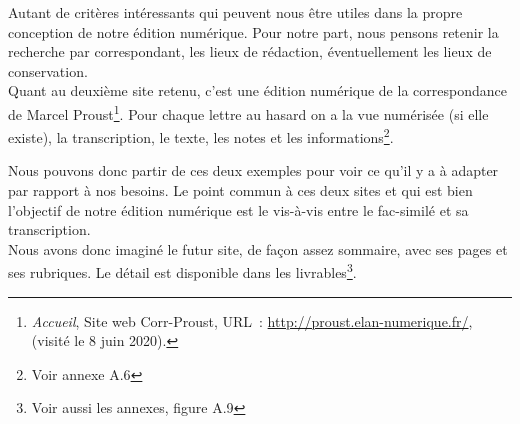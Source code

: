 Autant de critères intéressants qui peuvent nous être utiles dans la propre conception de notre édition numérique. Pour notre part, nous pensons retenir la recherche par correspondant, les lieux de rédaction, éventuellement les lieux de conservation.\\

Quant au deuxième site retenu, c’est une édition numérique de la correspondance de Marcel Proust\footnote{\emph{Accueil}, Site web Corr-Proust, URL : \url{http://proust.elan-numerique.fr/}, (visité le 8 juin 2020).}.
Pour chaque lettre au hasard on a la vue numérisée (si elle existe), la transcription, le texte, les notes et les informations\footnote{Voir annexe A.6}. 

Nous pouvons donc partir de ces deux exemples pour voir ce qu’il y a à adapter par rapport à nos besoins. Le point commun à ces deux sites et qui est bien l'objectif de notre édition numérique est le vis-à-vis entre le fac-similé et sa transcription. \\

Nous avons donc imaginé le futur site, de façon assez sommaire, avec ses pages et ses rubriques. Le détail est disponible dans les livrables\footnote{Voir aussi les annexes, figure A.9}.

